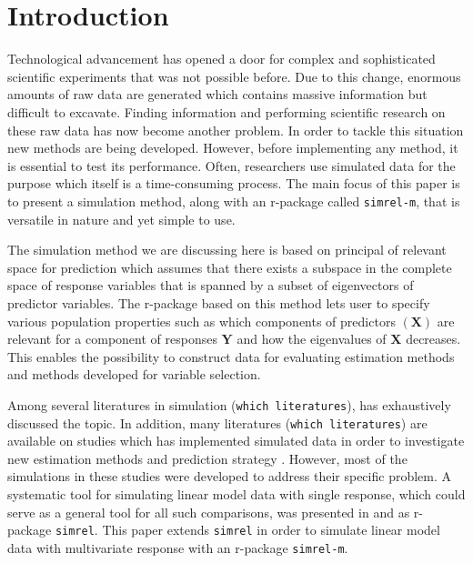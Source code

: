 \documentclass[12pt,A4paper,authoryear]{elsarticle} %
\begin{document}
\section{Introduction}\label{introduction}

Technological advancement has opened a door for complex and
sophisticated scientific experiments that was not possible before. Due
to this change, enormous amounts of raw data are generated which
contains massive information but difficult to excavate. Finding
information and performing scientific research on these raw data has now
become another problem. In order to tackle this situation new methods
are being developed. However, before implementing any method, it is
essential to test its performance. Often, researchers use simulated data
for the purpose which itself is a time-consuming process. The main focus
of this paper is to present a simulation method, along with an r-package
called \texttt{simrel-m}, that is versatile in nature and yet simple to
use.

The simulation method we are discussing here is based on principal of
relevant space for prediction \citep{helland1994comparison} which
assumes that there exists a subspace in the complete space of response
variables that is spanned by a subset of eigenvectors of predictor
variables. The r-package based on this method lets user to specify
various population properties such as which components of predictors
\((\mathbf{X})\) are relevant for a component of responses
\(\mathbf{Y}\) and how the eigenvalues of \(\mathbf{X}\) decreases. This
enables the possibility to construct data for evaluating estimation
methods and methods developed for variable selection.

Among several literatures in simulation
({\color{red}\texttt{which\ literatures}}), \citet{ripley2009stochastic}
has exhaustively discussed the topic. In addition, many literatures
({\color{red}\texttt{which\ literatures}}) are available on studies
which has implemented simulated data in order to investigate new
estimation methods and prediction strategy
\citep[see:][]{cook2015simultaneous, cook2013envelopes, helland2012near}.
However, most of the simulations in these studies were developed to
address their specific problem. A systematic tool for simulating linear
model data with single response, which could serve as a general tool for
all such comparisons, was presented in \citet{saebo2015simrel} and as
r-package \texttt{simrel}. This paper extends \texttt{simrel} in order
to simulate linear model data with multivariate response with an
r-package \texttt{simrel-m}.
\end{document}
